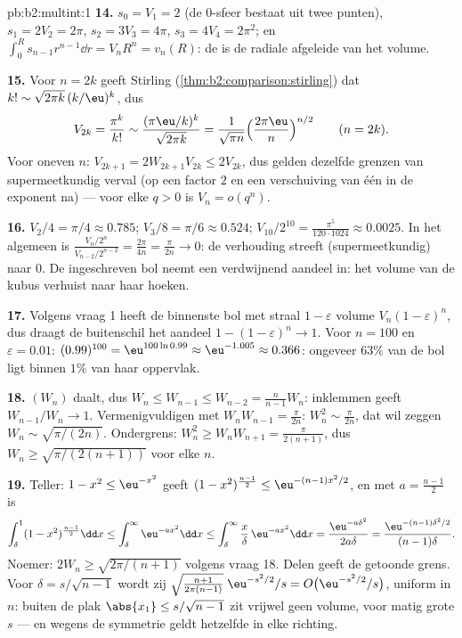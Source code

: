 \begin{solution}{pb:b2:multint:1}
\textbf{14.} $s_0 = V_1 = 2$ (de $0$-sfeer bestaat uit twee
punten), $s_1 = 2V_2 = 2\pi$, $s_2 = 3V_3 = 4\pi$, $s_3 = 4V_4 =
2\pi^2$; en $\int_0^R s_{n-1}r^{n-1}\dd r = V_nR^n = v_n(R)$: de
 is de radiale afgeleide van het volume.

\textbf{15.} Voor $n = 2k$ geeft Stirling
(\cref{thm:b2:comparison:stirling}) dat $k! \sim \sqrt{2\pi
k}\,(k/\eu)^k$, dus
\[
V_{2k} = \frac{\pi^k}{k!}
\sim \frac{(\pi\eu/k)^k}{\sqrt{2\pi k}}
= \frac1{\sqrt{\pi n}}\Bigl(\frac{2\pi\eu}n\Bigr)^{n/2}
\qquad (n = 2k).
\]
Voor oneven $n$: $V_{2k+1} = 2W_{2k+1}V_{2k} \leq 2V_{2k}$, dus
gelden dezelfde grenzen van supermeetkundig verval (op een factor
$2$ en een verschuiving van één in de exponent na) --- voor elke $q
> 0$ is $V_n = o(q^n)$.

\textbf{16.} $V_2/4 = \pi/4 \approx 0.785$; $V_3/8 = \pi/6 \approx
0.524$; $V_{10}/2^{10} = \frac{\pi^5}{120\cdot1024} \approx
0.0025$. In het algemeen is $\frac{V_n/2^n}{V_{n-2}/2^{n-2}} =
\frac{2\pi}{4n} = \frac{\pi}{2n} \to 0$: de verhouding streeft
(supermeetkundig) naar $0$. De ingeschreven bol neemt een
verdwijnend aandeel in: het volume van de kubus verhuist naar haar
hoeken.

\textbf{17.} Volgens vraag 1 heeft de binnenste bol met straal $1 -
\varepsilon$ volume $V_n(1-\varepsilon)^n$, dus draagt de
buitenschil het aandeel $1 - (1 - \varepsilon)^n \to 1$. Voor $n =
100$ en $\varepsilon = 0.01$: $(0.99)^{100} = \eu^{100\ln0.99}
\approx \eu^{-1.005} \approx 0.366$: ongeveer $63\%$ van de bol
ligt binnen $1\%$ van haar oppervlak.

\textbf{18.} $(W_n)$ daalt, dus $W_n \leq W_{n-1} \leq W_{n-2} =
\frac{n}{n-1}W_n$: inklemmen geeft $W_{n-1}/W_n \to 1$.
Vermenigvuldigen met $W_nW_{n-1} = \frac\pi{2n}$: $W_n^2 \sim
\frac\pi{2n}$, dat wil zeggen $W_n \sim \sqrt{\pi/(2n)}$.
Ondergrens: $W_n^2 \geq W_nW_{n+1} = \frac{\pi}{2(n+1)}$, dus $W_n
\geq \sqrt{\pi/(2(n+1))}$ voor elke $n$.

\textbf{19.} Teller: $1 - x^2 \leq \eu^{-x^2}$ geeft $(1 -
x^2)^{\frac{n-1}2} \leq \eu^{-(n-1)x^2/2}$, en met $a =
\frac{n-1}2$ is
\[
\int_\delta^1(1 - x^2)^{\frac{n-1}2}\dd x
\leq \int_\delta^\infty\eu^{-ax^2}\dd x
\leq \int_\delta^\infty\frac x\delta\,\eu^{-ax^2}\dd x
= \frac{\eu^{-a\delta^2}}{2a\delta}
= \frac{\eu^{-(n-1)\delta^2/2}}{(n-1)\delta}.
\]
Noemer: $2W_n \geq \sqrt{2\pi/(n+1)}$ volgens vraag 18. Delen geeft
de getoonde grens. Voor $\delta = s/\sqrt{n-1}$ wordt zij
$\sqrt{\tfrac{n+1}{2\pi(n-1)}}\;\eu^{-s^2/2}/s = O\bigl(
\eu^{-s^2/2}/s\bigr)$, uniform in $n$: buiten de plak $\abs{x_1}
\leq s/\sqrt{n-1}$ zit vrijwel geen volume, voor matig grote $s$
--- en wegens de symmetrie geldt hetzelfde in elke richting.


\end{solution}
